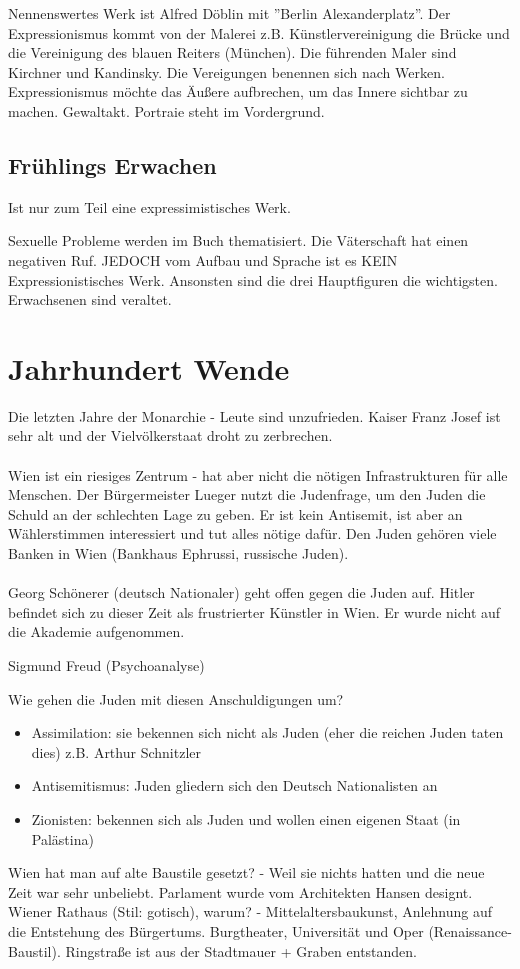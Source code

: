 \documentclass[12pt,a4paper]{article}
\begin{document}
Nennenswertes Werk ist Alfred Döblin mit ''Berlin Alexanderplatz''.
Der Expressionismus kommt von der Malerei z.B. Künstlervereinigung die Brücke und die Vereinigung des blauen Reiters (München). Die führenden Maler sind Kirchner und Kandinsky. Die Vereigungen benennen sich nach Werken. Expressionismus möchte das Äußere aufbrechen, um das Innere sichtbar zu machen. Gewaltakt. Portraie steht im Vordergrund.

\subsection{Frühlings Erwachen}

Ist nur zum Teil eine expressimistisches Werk.

Sexuelle Probleme werden im Buch thematisiert.
Die Väterschaft hat einen negativen Ruf.
JEDOCH vom Aufbau und Sprache ist es KEIN Expressionistisches Werk.
Ansonsten sind die drei Hauptfiguren die wichtigsten. Erwachsenen sind veraltet.

\section{Jahrhundert Wende}

Die letzten Jahre der Monarchie - Leute sind unzufrieden. Kaiser Franz Josef ist sehr alt und der Vielvölkerstaat droht zu zerbrechen.\\\\
Wien ist ein riesiges Zentrum - hat aber nicht die nötigen Infrastrukturen für alle Menschen. Der Bürgermeister Lueger nutzt die Judenfrage, um den Juden die Schuld an der schlechten Lage zu geben. Er ist kein Antisemit, ist aber an Wählerstimmen interessiert und tut alles nötige dafür. Den Juden gehören viele Banken in Wien (Bankhaus Ephrussi, russische Juden).\\\\
Georg Schönerer (deutsch Nationaler) geht offen gegen die Juden auf. Hitler befindet sich zu dieser Zeit als frustrierter Künstler in Wien. Er wurde nicht auf die Akademie aufgenommen.

Sigmund Freud (Psychoanalyse)

Wie gehen die Juden mit diesen Anschuldigungen um?

\begin{itemize}
\item Assimilation: sie bekennen sich nicht als Juden (eher die reichen Juden taten dies) z.B. Arthur Schnitzler
\item Antisemitismus: Juden gliedern sich den Deutsch Nationalisten an
\item Zionisten: bekennen sich als Juden und wollen einen eigenen Staat (in Palästina)
\end{itemize}
Wien hat man auf alte Baustile gesetzt? - Weil sie nichts hatten und die neue Zeit war sehr unbeliebt. Parlament wurde vom Architekten Hansen designt. Wiener Rathaus (Stil: gotisch), warum? - Mittelaltersbaukunst, Anlehnung auf die Entstehung des Bürgertums. Burgtheater, Universität und Oper (Renaissance-Baustil). Ringstraße ist aus der Stadtmauer + Graben entstanden.
\end{document}
